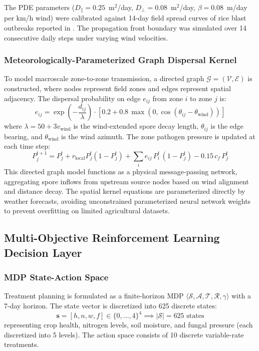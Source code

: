\documentclass[review,3p,times,authoryear]{elsarticle}
\begin{document}
The PDE parameters ($D_{\parallel} = 0.25$~m$^2$/day, $D_{\perp} = 0.08$~m$^2$/day, $\beta = 0.08$~m/day per km/h wind) were calibrated against 14-day field spread curves of rice blast outbreaks reported in \citet{kashyap2021}. The propagation front boundary was simulated over 14 consecutive daily steps under varying wind velocities.

\subsubsection{Meteorologically-Parameterized Graph Dispersal Kernel}
To model macroscale zone-to-zone transmission, a directed graph $\mathcal{G} = (\mathcal{V}, \mathcal{E})$ is constructed, where nodes represent field zones and edges represent spatial adjacency. The dispersal probability on edge $e_{ij}$ from zone $i$ to zone $j$ is:
\begin{equation}
e_{ij} = \exp\!\left(-\frac{d_{ij}}{\lambda}\right) \cdot \left[0.2 + 0.8\,\max\!\left(0, \cos(\theta_{ij} - \theta_\text{wind})\right)\right]
\end{equation}
where $\lambda = 50 + 3v_\text{wind}$ is the wind-extended spore decay length, $\theta_{ij}$ is the edge bearing, and $\theta_\text{wind}$ is the wind azimuth. The zone pathogen pressure is updated at each time step:
\begin{equation}
P_j^{t+1} = P_j^t + r_\text{local}P_j^t(1 - P_j^t) + \sum_i e_{ij}\,P_i^t\,(1 - P_j^t) - 0.15\,c_f\,P_j^t
\end{equation}
This directed graph model functions as a physical message-passing network, aggregating spore inflows from upstream source nodes based on wind alignment and distance decay. The spatial kernel equations are parameterized directly by weather forecasts, avoiding unconstrained parameterized neural network weights to prevent overfitting on limited agricultural datasets.

\subsection{Multi-Objective Reinforcement Learning Decision Layer}

\subsubsection{MDP State-Action Space}
Treatment planning is formulated as a finite-horizon MDP $\langle \mathcal{S}, \mathcal{A}, \mathcal{T}, \mathcal{R}, \gamma \rangle$ with a 7-day horizon. The state vector is discretized into 625 discrete states:
\begin{equation}
\mathbf{s} = [h, n, w, f] \in \{0,\dots,4\}^4 \implies |\mathcal{S}| = 625 \text{ states}
\end{equation}
representing crop health, nitrogen levels, soil moisture, and fungal pressure (each discretized into 5 levels). The action space consists of 10 discrete variable-rate treatments. 
\end{document}

